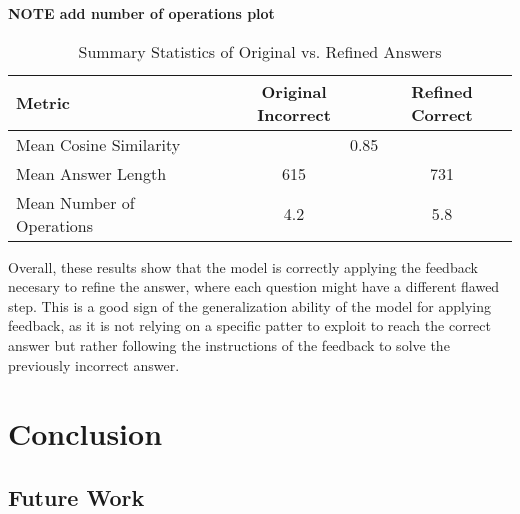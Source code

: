\documentclass[a4paper,10pt]{article}
\begin{document}
\textbf{NOTE add number of operations plot}
\begin{table}[ht]
\centering
\begin{tabular}{lcc}
\hline
Metric & Original Incorrect & Refined Correct \\
\hline
Mean Cosine Similarity & \multicolumn{2}{c}{0.85} \\
Mean Answer Length & 615 & 731 \\
Mean Number of Operations & 4.2 & 5.8 \\
\hline
\end{tabular}
\caption{Summary Statistics of Original vs. Refined Answers}
\label{tab:summary}
\end{table}

Overall, these results show that the model is correctly applying the feedback necesary to refine the answer, where each question might have a different flawed step. This is a good sign of the generalization ability of the model for applying feedback, as it is not relying on a specific patter to exploit to reach the correct answer but rather following the instructions of the feedback to solve the previously incorrect answer.

\section{Conclusion}

\subsection{Future Work}
\end{document}
